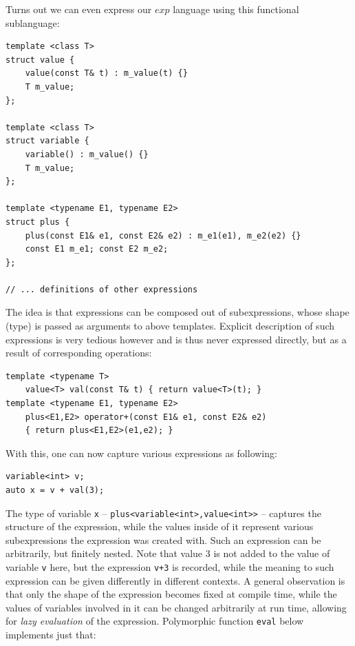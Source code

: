 \documentclass[preprint]{sigplanconf}
\makeatletter
\DeclareRobustCommand{\code}[1]{{\lstinline[breaklines=false,escapechar=@]{#1}}}
\makeatother
\begin{document}
Turns out we can even express our $exp$ language using this functional 
sublanguage:

\begin{lstlisting}
template <class T>
struct value {
    value(const T& t) : m_value(t) {}
    T m_value;
};

template <class T>
struct variable {
    variable() : m_value() {}
    T m_value;
};

template <typename E1, typename E2>
struct plus {
    plus(const E1& e1, const E2& e2) : m_e1(e1), m_e2(e2) {}
    const E1 m_e1; const E2 m_e2;
};

// ... definitions of other expressions
\end{lstlisting}

\noindent The idea is that expressions can be composed out of subexpressions, 
whose shape (type) is passed as arguments to above templates. Explicit 
description of such expressions is very tedious however and is thus never 
expressed directly, but as a result of corresponding operations: 

\begin{lstlisting}[keepspaces,columns=flexible]
template <typename T>
    value<T> val(const T& t) { return value<T>(t); }
template <typename E1, typename E2>
    plus<E1,E2> operator+(const E1& e1, const E2& e2)
    { return plus<E1,E2>(e1,e2); }
\end{lstlisting}

\noindent With this, one can now capture various expressions as following:

\begin{lstlisting}
variable<int> v;
auto x = v + val(3);
\end{lstlisting}

\noindent The type of variable \code{x} -- \code{plus<variable<int>,value<int>>}
 -- captures the structure of the expression, while the values inside of it 
represent various subexpressions the expression was created with. Such an 
expression can be arbitrarily, but finitely nested. Note that value 3 is not 
added to the value of variable \code{v} here, but the expression \code{v+3} is 
recorded, while the meaning to such expression can be given differently in 
different contexts. A general observation is that only the shape of the 
expression becomes fixed at compile time, while the values of variables involved 
in it can be changed arbitrarily at run time, allowing for \emph{lazy 
evaluation} of the expression. Polymorphic function \code{eval} below implements 
just that:
\end{document}
